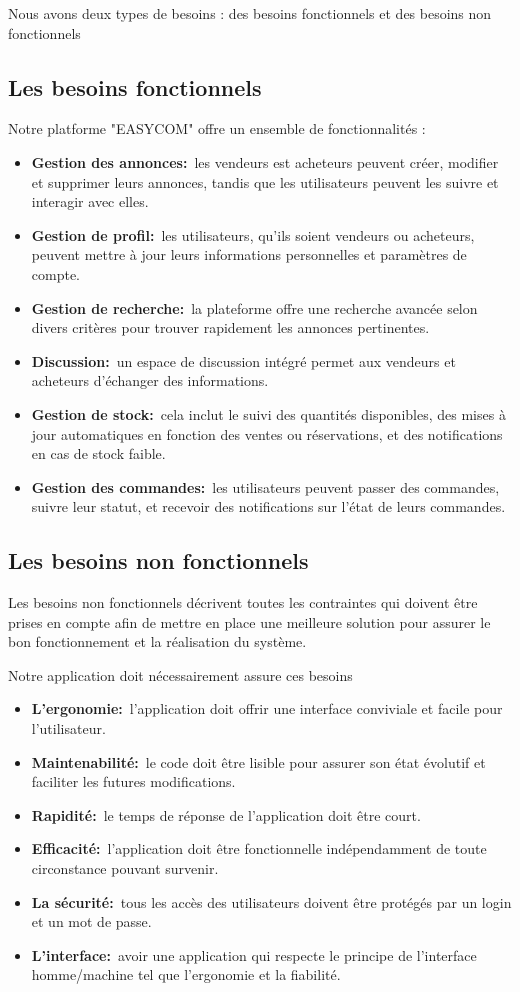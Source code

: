 \documentclass[edit,12pt,a4paper,ChapStyle,oneside,doubleinterligne]{report}
\begin{document}
Nous avons deux types de besoins : des besoins fonctionnels et des besoins non fonctionnels
\subsection{Les besoins fonctionnels }
Notre platforme "EASYCOM" offre un ensemble de fonctionnalités :
\begin{itemize}
    \item \textbf{Gestion des annonces:}~les vendeurs est acheteurs peuvent créer, modifier et supprimer leurs annonces, tandis que les utilisateurs peuvent les suivre et interagir avec elles.
    \item \textbf{Gestion de profil:}~les utilisateurs, qu'ils soient vendeurs ou acheteurs, peuvent mettre à jour leurs informations personnelles et paramètres de compte.
    \item \textbf{Gestion de recherche:}~la plateforme offre une recherche avancée selon divers critères pour trouver rapidement les annonces pertinentes.
    \item \textbf{Discussion:}~un espace de discussion intégré permet aux vendeurs et acheteurs d'échanger des informations.
    \item \textbf{Gestion de stock:}~cela inclut le suivi des quantités disponibles, des mises à jour automatiques en fonction des ventes ou réservations, et des notifications en cas de stock faible. 
    \item \textbf{Gestion des commandes:}~les utilisateurs peuvent passer des commandes, suivre leur statut, et recevoir des notifications sur l'état de leurs commandes.
\end{itemize}
\subsection{Les besoins non fonctionnels}
Les besoins non fonctionnels décrivent toutes les contraintes qui doivent être prises en compte afin de mettre en place une meilleure solution pour assurer le bon fonctionnement et la réalisation du système.

Notre application doit nécessairement assure ces besoins
\begin{itemize}
    \item \textbf{L’ergonomie:}~l’application doit offrir une interface conviviale et facile pour l’utilisateur.
    \item \textbf{Maintenabilité:}~le code doit être lisible pour assurer son état évolutif et faciliter les futures modifications.
    \item \textbf{Rapidité:}~le temps de réponse de l’application doit être court.
    \item \textbf{Efficacité:}~l’application doit être fonctionnelle indépendamment de toute circonstance pouvant survenir.
    \item \textbf{La sécurité:}~tous les accès des utilisateurs doivent être protégés par un login et un mot de passe.
    \item \textbf{L’interface:}~avoir une application qui respecte le principe de l'interface homme/machine tel que l'ergonomie et la fiabilité.
\end{itemize}
\end{document}
